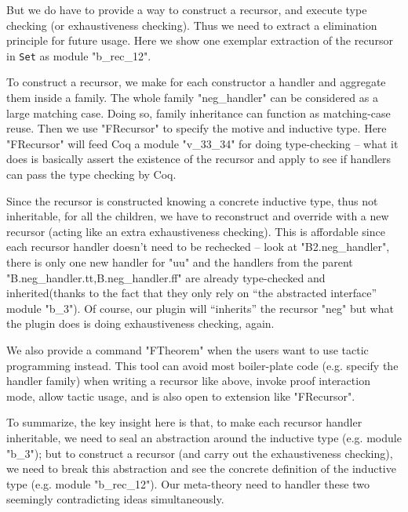 But we do have to provide a way to construct a recursor, and execute type checking (or exhaustiveness checking). Thus we need to extract a elimination principle for future usage. Here we show one exemplar extraction of the recursor in \texttt{Set} as module "b_rec_12".

To construct a recursor, we make for each constructor a handler and aggregate them inside a family. The whole family "neg_handler" can be considered as a large matching case. Doing so, family inheritance can function as matching-case reuse. Then we use "FRecursor" to specify the motive and inductive type. Here "FRecursor" will feed Coq
a module "v_33_34" for doing type-checking -- what it does is basically assert the existence of the recursor and apply to see if handlers can pass the type checking by Coq. 

Since the recursor is constructed knowing a concrete inductive type, thus not inheritable, for all the children, we have to reconstruct and override with a new recursor (acting like an extra exhaustiveness checking). This is affordable since each recursor handler doesn't need to be rechecked -- look at "B2.neg_handler", there is only one new handler for "uu" and the handlers from the parent "B.neg_handler.tt,B.neg_handler.ff" are already type-checked and inherited(thanks to the fact that they only rely on ``the abstracted interface'' module "b_3"). Of course, our plugin will ``inherits'' the recursor "neg" but what the plugin does is doing exhaustiveness checking, again.



We also provide a command "FTheorem" when the users want to use tactic programming instead. This tool can avoid most boiler-plate code (e.g. specify the handler family) when writing a recursor like above, invoke proof interaction mode, allow tactic usage, and is also open to extension like "FRecursor".

To summarize, the key insight here is that, to make each recursor handler inheritable, we need to seal an abstraction around the inductive type (e.g. module "b_3"); but to construct a recursor (and carry out the exhaustiveness checking), we need to break this abstraction and see the concrete definition of the inductive type (e.g. module "b_rec_12"). Our meta-theory need to handler these two seemingly contradicting ideas simultaneously. 


